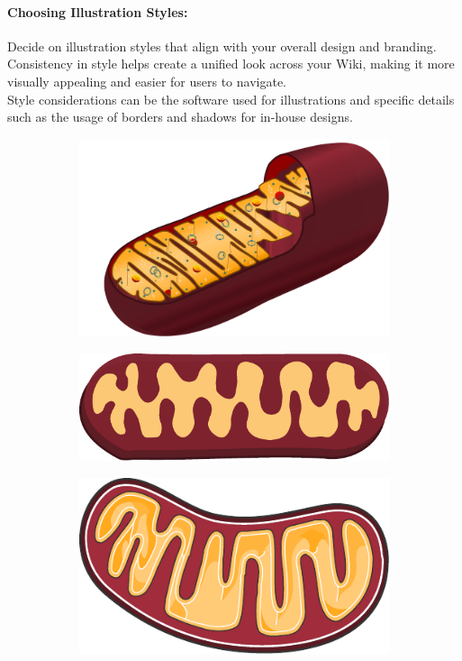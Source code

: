 \paragraph{Choosing Illustration Styles:} Decide on illustration styles that align with your overall design and branding.
Consistency in style helps create a unified look across your Wiki, making it more visually appealing and easier for users to navigate. \\
Style considerations can be the software used for illustrations and specific details such as the usage of borders and shadows for in-house designs.
\begin{figure}[H]
    \centering
    \begin{subfigure}[t]{0.3\linewidth}
        \includegraphics[width=\textwidth]{chapters/images/animal_mitochondrion}
    \end{subfigure}
    \begin{subfigure}[t]{0.3\linewidth}
        \includegraphics[width=\textwidth]{chapters/images/mitochondrium-rod}
    \end{subfigure}
    \begin{subfigure}[t]{0.3\linewidth}
        \includegraphics[width=\textwidth]{chapters/images/mitochondrium-servier}

\end{subfigure}
\end{figure}
